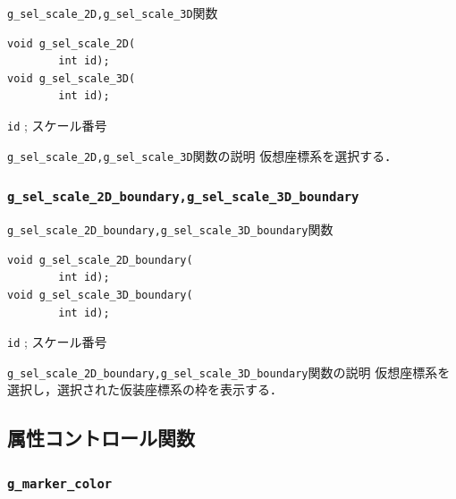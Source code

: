 \documentclass[platex,a4paper,12pt]{jsarticle}%
\begin{document}
\begin{itembox}[l]{\texttt{g\_sel\_scale\_2D,g\_sel\_scale\_3D}関数}
\begin{verbatim}
void g_sel_scale_2D(
        int id);
void g_sel_scale_3D(
        int id);
   \end{verbatim}
\verb|id| ; スケール番号
\end{itembox}

\begin{itembox}[l]{\texttt{g\_sel\_scale\_2D,g\_sel\_scale\_3D}関数の説明}
仮想座標系を選択する．
\end{itembox}




\subsubsection{\texttt{g\_sel\_scale\_2D\_boundary,g\_sel\_scale\_3D\_boundary}}

\begin{itembox}[l]{\texttt{g\_sel\_scale\_2D\_boundary,g\_sel\_scale\_3D\_boundary}関数}
\begin{verbatim}
void g_sel_scale_2D_boundary(
        int id);
void g_sel_scale_3D_boundary(
        int id);
   \end{verbatim}
\verb|id| ; スケール番号
\end{itembox}

\begin{itembox}[l]{\texttt{g\_sel\_scale\_2D\_boundary,g\_sel\_scale\_3D\_boundary}関数の説明}
仮想座標系を選択し，選択された仮装座標系の枠を表示する．
\end{itembox}




\clearpage
\subsection{属性コントロール関数}

\subsubsection{\texttt{g\_marker\_color}}
\end{document}
